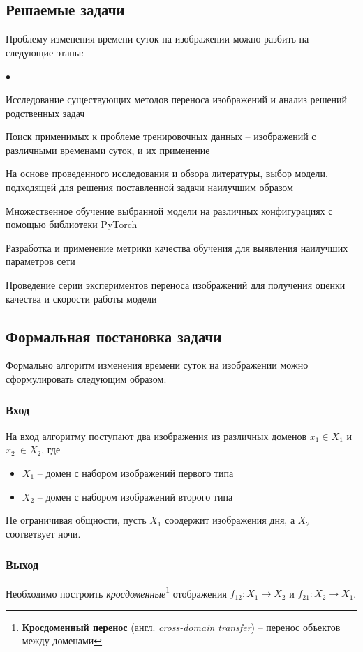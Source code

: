 \documentclass[11pt,a4paper]{extarticle}
\newenvironment{compactlist}{
\begin{list}{{$\bullet$}}{
\setlength\partopsep{0pt}
\setlength\parskip{0pt}
\setlength\parsep{0pt}
\setlength\topsep{0pt}
\setlength\itemsep{0pt}
}}{
\end{list}
}
\begin{document}
	\subsection{Решаемые задачи}
		Проблему изменения времени суток на изображении можно разбить на следующие этапы:

		\begin{compactlist}
			\item Исследование существующих методов переноса изображений и анализ решений родственных задач
			\item Поиск применимых к проблеме тренировочных данных -- изображений с различными временами суток, и их применение
			\item На основе проведенного исследования и обзора литературы, выбор модели, подходящей для решения поставленной задачи
			наилучшим образом
			\item Множественное обучение выбранной модели на различных конфигурациях с помощью библиотеки PyTorch
			\item Разработка и применение метрики качества обучения для выявления наилучших параметров сети
			\item Проведение серии экспериментов переноса изображений для получения оценки качества и скорости работы модели 
		\end{compactlist}

	\subsection{Формальная постановка задачи}
		Формально алгоритм изменения времени суток на изображении можно сформулировать следующим образом:

		\subsubsection*{Вход}
			На вход алгоритму поступают два изображения из различных доменов \(x_{1} \in X_{1}\)  и \(x_{2}\ \in X_{2}\), где
			\begin{itemize}
				\item \(X_{1}\) -- домен с набором изображений первого типа
				\item \(X_{2}\) -- домен с набором изображений второго типа
			\end{itemize}
			Не ограничивая общности, пусть \(X_{1}\) соодержит изображения дня, а \(X_{2}\) соответвует ночи.
		\subsubsection*{Выход}
			Необходимо построить \textit{кросдоменные}\footnote{
				\textbf{Кросдоменный перенос} (англ. \textit{cross-domain transfer}) -- перенос объектов между доменами 
			} отображения \(f_{12}\!: X_{1} \longrightarrow X_{2}\) и \(f_{21}\!: X_{2} \longrightarrow X_{1}\).
			
\end{document}
